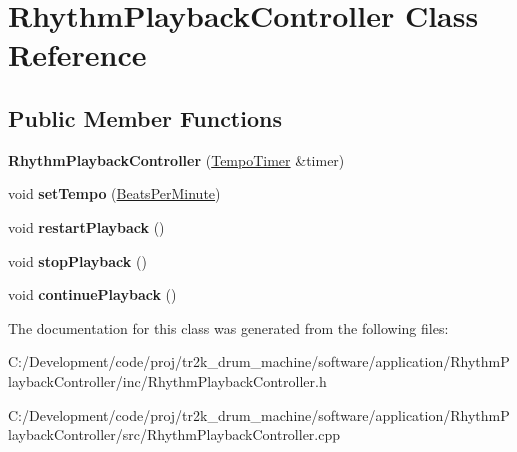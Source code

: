 \hypertarget{class_rhythm_playback_controller}{}\section{Rhythm\+Playback\+Controller Class Reference}
\label{class_rhythm_playback_controller}
\subsection*{Public Member Functions}
\begin{DoxyCompactItemize}
\item 
\mbox{\label{class_rhythm_playback_controller_a9f280da7a6477eafe98fc4fc57b02a67}} 
{\bfseries Rhythm\+Playback\+Controller} (\mbox{\hyperlink{class_tempo_timer}{Tempo\+Timer}} \&timer)
\item 
\mbox{\label{class_rhythm_playback_controller_ad61f44263753a449470b112870187060}} 
void {\bfseries set\+Tempo} (\mbox{\hyperlink{class_beats_per_minute}{Beats\+Per\+Minute}})
\item 
\mbox{\label{class_rhythm_playback_controller_ad1c705dd42b2d91fb9171996fabbe507}} 
void {\bfseries restart\+Playback} ()
\item 
\mbox{\label{class_rhythm_playback_controller_a28db76a203bc7a143e37677cdf0ea602}} 
void {\bfseries stop\+Playback} ()
\item 
\mbox{\label{class_rhythm_playback_controller_a651af2f689e72a3b3bc5e172e12a965c}} 
void {\bfseries continue\+Playback} ()
\end{DoxyCompactItemize}


The documentation for this class was generated from the following files\+:\begin{DoxyCompactItemize}
\item 
C\+:/\+Development/code/proj/tr2k\+\_\+drum\+\_\+machine/software/application/\+Rhythm\+Playback\+Controller/inc/Rhythm\+Playback\+Controller.\+h\item 
C\+:/\+Development/code/proj/tr2k\+\_\+drum\+\_\+machine/software/application/\+Rhythm\+Playback\+Controller/src/Rhythm\+Playback\+Controller.\+cpp\end{DoxyCompactItemize}
